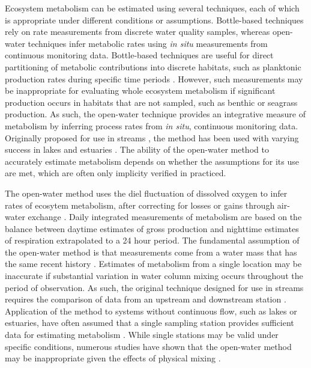 \documentclass[letterpaper,12pt,oneside]{article}\usepackage[]{graphicx}\usepackage[]{color}
\begin{document}
Ecosystem metabolism can be estimated using several techniques, each of which is appropriate under different conditions or assumptions.   Bottle-based techniques rely on rate measurements from discrete water quality samples, whereas open-water techniques infer metabolic rates using \textit{in situ} measurements from continuous monitoring data.  Bottle-based techniques are useful for direct partitioning of metabolic contributions into discrete habitats, such as planktonic production rates during specific time periods \citep{Kemp12}.  However, such measurements may be inappropriate for evaluating whole ecosystem metabolism if significant production occurs in habitats that are not sampled, such as benthic or seagrass production.  As such, the open-water technique provides an integrative measure of metabolism by inferring process rates from \textit{in situ}, continuous monitoring data.  Originally proposed for use in streams \citep{Odum56}, the method has been used with varying success in lakes \citep{Staehr10,Coloso11,Batt12} and estuaries \citep{Caffrey04,Hopkinson05,Caffrey13}.  The ability of the open-water method to accurately estimate metabolism depends on whether the assumptions for its use are met, which are often only implicity verified in practiced. 

The open-water method uses the diel fluctuation of dissolved oxygen to infer rates of ecosytem metabolism, after correcting for losses or gains through air-water exchange \citep{Kemp12}.  Daily integrated measurements of metabolism are based on the balance between daytime estimates of gross production and nighttime estimates of respiration extrapolated to a 24 hour period.  The fundamental assumption of the open-water method is that measurements come from a water mass that has the same recent history \citep{Needoba12}.  Estimates of metabolism from a single location may be inaccurate if substantial variation in water column mixing occurs throughout the period of observation.  As such, the original technique designed for use in streams requires the comparison of data from an upstream and downstream station \citep{Odum56}.  Application of the method to systems without continuous flow, such as lakes or estuaries, have often assumed that a single sampling station provides sufficient data for estimating metabolism \cite{Staehr10}.  While single stations may be valid under specific conditions, numerous studies have shown that the open-water method may be inappropriate given the effects of physical mixing \citep{Ziegler98,Caffrey03,Coloso11,Batt12,Nidzieko14}.
\end{document}
